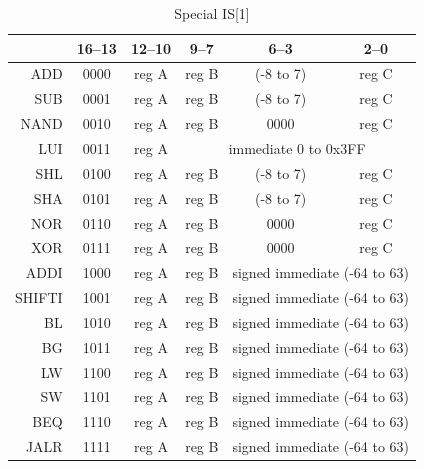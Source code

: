 \documentclass[10pt,a4paper]{article}
\theoremstyle{definition}%
\begin{document}
\begin{table}[ht!]
\begin{center}
		\begin{tabular}{r|c|c|c|c|c}%
		\toprule
		\diaghead{bourage~}{Instr}{ bit}	& 16--13  & 12--10  & {9--7}  & 6--3  & {2--0}\\
		\midrule
		ADD & 0000 & reg A & reg B & (-8 to 7) & {reg C} \\
		SUB & 0001 & reg A & reg B & (-8 to 7) & {reg C} \\
		NAND & 0010 & reg A & reg B & 0000 & {reg C} \\ \cmidrule{4-6} %
		LUI & 0011 & reg A & \multicolumn{3}{c}{immediate 0 to 0x3FF} \\ %
		\cmidrule{4-6}
		SHL & 0100 & reg A & reg B & (-8 to 7) & {reg C} \\
		SHA & 0101 & reg A & reg B & (-8 to 7) & {reg C} \\
		NOR & 0110 & reg A & reg B & 0000 & {reg C} \\
		XOR & 0111 & reg A & reg B & 0000 & {reg C} \\
		\cmidrule{5-6}
		ADDI & 1000 & reg A & reg B & \multicolumn{2}{c}{signed immediate (-64 to 63)} \\
		SHIFTI & 1001 & reg A & reg B & \multicolumn{2}{c}{signed immediate (-64 to 63)} \\
		BL & 1010 & reg A & reg B & \multicolumn{2}{c}{signed immediate (-64 to 63)} \\
		BG & 1011 & reg A & reg B & \multicolumn{2}{c}{signed immediate (-64 to 63)} \\
		LW& 1100 & reg A & reg B & \multicolumn{2}{c}{signed immediate (-64 to 63)} \\
		SW& 1101 & reg A & reg B & \multicolumn{2}{c}{signed immediate (-64 to 63)} \\
		BEQ & 1110 & reg A & reg B & \multicolumn{2}{c}{signed immediate (-64 to 63)} \\
		JALR & 1111 & reg A & reg B & \multicolumn{2}{c}{signed immediate (-64 to 63)} \\
		\bottomrule
		\end{tabular}
	\end{center}
\caption{Special IS[1]}
\label{tab:IS1}
\end{table}
\end{document}
